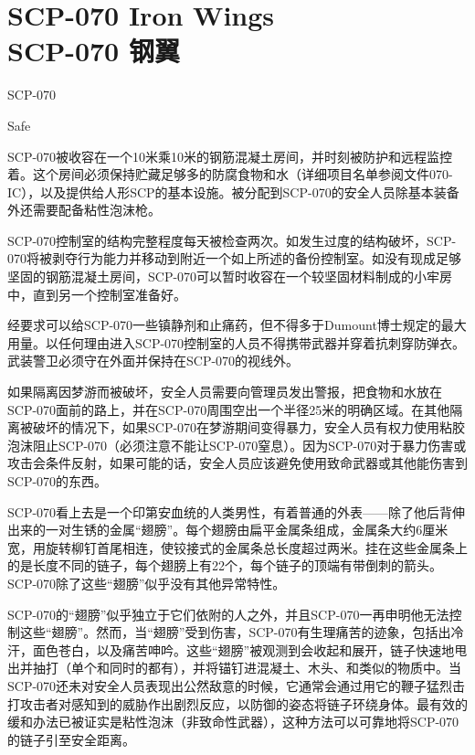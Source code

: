 \chapter[SCP-070 钢翼]{
    SCP-070 Iron Wings\\
    SCP-070 钢翼
}

\label{chap:SCP-070}

SCP-070

Safe

SCP-070被收容在一个10米乘10米的钢筋混凝土房间，并时刻被防护和远程监控着。这个房间必须保持贮藏足够多的防腐食物和水（详细项目名单参阅文件070-IC），以及提供给人形SCP的基本设施。被分配到SCP-070的安全人员除基本装备外还需要配备粘性泡沫枪。

SCP-070控制室的结构完整程度每天被检查两次。如发生过度的结构破坏，SCP-070将被剥夺行为能力并移动到附近一个如上所述的备份控制室。如没有现成足够坚固的钢筋混凝土房间，SCP-070可以暂时收容在一个较坚固材料制成的小牢房中，直到另一个控制室准备好。

经要求可以给SCP-070一些镇静剂和止痛药，但不得多于Dumount博士规定的最大用量。以任何理由进入SCP-070控制室的人员不得携带武器并穿着抗刺穿防弹衣。武装警卫必须守在外面并保持在SCP-070的视线外。

如果隔离因梦游而被破坏，安全人员需要向管理员发出警报，把食物和水放在SCP-070面前的路上，并在SCP-070周围空出一个半径25米的明确区域。在其他隔离被破坏的情况下，如果SCP-070在梦游期间变得暴力，安全人员有权力使用粘胶泡沫阻止SCP-070（必须注意不能让SCP-070窒息）。因为SCP-070对于暴力伤害或攻击会条件反射，如果可能的话，安全人员应该避免使用致命武器或其他能伤害到SCP-070的东西。

SCP-070看上去是一个印第安血统的人类男性，有着普通的外表——除了他后背伸出来的一对生锈的金属“翅膀”。每个翅膀由扁平金属条组成，金属条大约6厘米宽，用旋转柳钉首尾相连，使铰接式的金属条总长度超过两米。挂在这些金属条上的是长度不同的链子，每个翅膀上有22个，每个链子的顶端有带倒刺的箭头。SCP-070除了这些“翅膀”似乎没有其他异常特性。

SCP-070的“翅膀”似乎独立于它们依附的人之外，并且SCP-070一再申明他无法控制这些“翅膀”。然而，当“翅膀”受到伤害，SCP-070有生理痛苦的迹象，包括出冷汗，面色苍白，以及痛苦呻吟。这些“翅膀”被观测到会收起和展开，链子快速地甩出并抽打（单个和同时的都有），并将锚钉进混凝土、木头、和类似的物质中。当SCP-070还未对安全人员表现出公然敌意的时候，它通常会通过用它的鞭子猛烈击打攻击者对感知到的威胁作出剧烈反应，以防御的姿态将链子环绕身体。最有效的缓和办法已被证实是粘性泡沫（非致命性武器），这种方法可以可靠地将SCP-070的链子引至安全距离。

